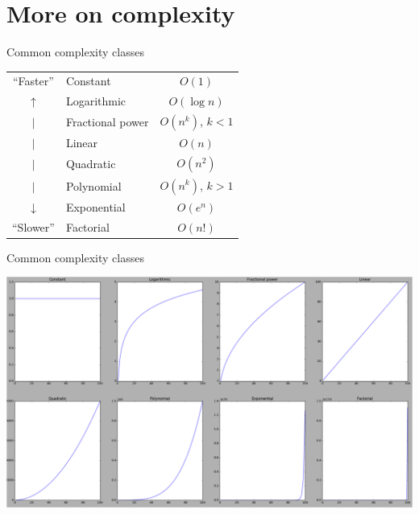 \part{More on complexity}
\frame{\partpage}

\begin{frame}{Common complexity classes}
	\begin{center}
		\begin{tabular}{clc}
			\pause ``Faster'' & Constant & $O(1)$ \\
			\pause $\uparrow$ & Logarithmic & $O(\log n)$ \\
			\pause $|$ & Fractional power & $O(n^k)$, $k < 1$ \\
			\pause $|$ & Linear & $O(n)$ \\
			\pause $|$ & Quadratic & $O(n^2)$ \\
			\pause $|$ & Polynomial & $O(n^k)$, $k > 1$  \\
			\pause $\downarrow$ & Exponential & $O(e^n)$ \\
			\pause ``Slower'' & Factorial & $O(n!)$
		\end{tabular}
	\end{center}
\end{frame}

\begin{frame}{Common complexity classes}
	\begin{center}
		\includegraphics[width=\textwidth]{complexity_classes}
	\end{center}
\end{frame}

